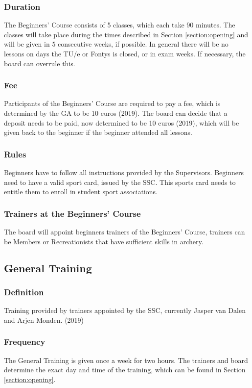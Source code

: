 \documentclass[a4paper]{article}
\begin{document}
\subsubsection{Duration}
The Beginners' Course consists of 5 classes, which each take 90 minutes. The classes will take place during the times described in Section \ref{section:opening} and will be given in 5 consecutive weeks, if possible. In general there will be no lessons on days the TU/e or Fontys is closed, or in exam weeks. If necessary, the board can overrule this.

\subsubsection{Fee}
Participants of the Beginners' Course are required to pay a fee, which is determined by the GA to be 10 euros {\g (2019)}. The board can decide that a deposit needs to be paid, now determined to be 10 euros {\g (2019)}, which will be given back to the beginner if the beginner attended all lessons.

\subsubsection{Rules}
Beginners have to follow all instructions provided by the Supervisors. Beginners need to have a valid sport card, issued by the SSC. This sports card needs to entitle them to enroll in student sport associations.

\subsubsection{Trainers at the Beginners' Course}
The board will appoint beginners trainers of the Beginners' Course, trainers can be Members or Recreationists that have sufficient skills in archery.

\subsection{General Training}
\subsubsection{Definition}
Training provided by trainers appointed by the SSC, currently Jasper van Dalen and Arjen Monden. {\g (2019)}

\subsubsection{Frequency}
The General Training is given once a week for two hours. The trainers and board determine the exact day and time of the training, which can be found in Section \ref{section:opening}.
\end{document}
